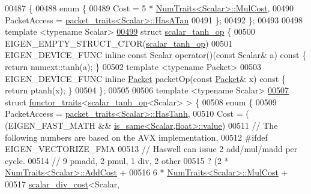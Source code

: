 \begin{DoxyCode}
00487 \{
00488   \textcolor{keyword}{enum} \{
00489     Cost = 5 * \hyperlink{group___core___module_struct_eigen_1_1_num_traits}{NumTraits<Scalar>::MulCost},
00490     PacketAccess = \hyperlink{struct_eigen_1_1internal_1_1packet__traits}{packet\_traits<Scalar>::HasATan}
00491   \};
00492 \};
00493 
00498 \textcolor{keyword}{template} <\textcolor{keyword}{typename} Scalar>
\hyperlink{struct_eigen_1_1internal_1_1scalar__tanh__op}{00499} \textcolor{keyword}{struct }\hyperlink{struct_eigen_1_1internal_1_1scalar__tanh__op}{scalar\_tanh\_op} \{
00500   EIGEN\_EMPTY\_STRUCT\_CTOR(\hyperlink{struct_eigen_1_1internal_1_1scalar__tanh__op}{scalar\_tanh\_op})
00501   EIGEN\_DEVICE\_FUNC \textcolor{keyword}{inline} \textcolor{keyword}{const} Scalar operator()(\textcolor{keyword}{const} Scalar& a)\textcolor{keyword}{ const }\{ \textcolor{keywordflow}{return} numext::tanh(a); \}
00502   \textcolor{keyword}{template} <\textcolor{keyword}{typename} Packet>
00503   EIGEN\_DEVICE\_FUNC \textcolor{keyword}{inline} \hyperlink{union_eigen_1_1internal_1_1_packet}{Packet} packetOp(\textcolor{keyword}{const} \hyperlink{union_eigen_1_1internal_1_1_packet}{Packet}& x)\textcolor{keyword}{ const }\{ \textcolor{keywordflow}{return} ptanh(x); \}
00504 \};
00505 
00506 \textcolor{keyword}{template} <\textcolor{keyword}{typename} Scalar>
\hyperlink{struct_eigen_1_1internal_1_1functor__traits_3_01scalar__tanh__op_3_01_scalar_01_4_01_4}{00507} \textcolor{keyword}{struct }\hyperlink{struct_eigen_1_1internal_1_1functor__traits}{functor\_traits}<\hyperlink{struct_eigen_1_1internal_1_1scalar__tanh__op}{scalar\_tanh\_op}<Scalar> > \{
00508   \textcolor{keyword}{enum} \{
00509     PacketAccess = \hyperlink{struct_eigen_1_1internal_1_1packet__traits}{packet\_traits<Scalar>::HasTanh},
00510     Cost = ( (EIGEN\_FAST\_MATH && \hyperlink{struct_eigen_1_1internal_1_1is__same}{is\_same<Scalar,float>::value})
00511 \textcolor{comment}{// The following numbers are based on the AVX implementation,}
00512 #ifdef EIGEN\_VECTORIZE\_FMA
00513                 \textcolor{comment}{// Haswell can issue 2 add/mul/madd per cycle.}
00514                 \textcolor{comment}{// 9 pmadd, 2 pmul, 1 div, 2 other}
00515                 ? (2 * \hyperlink{group___core___module_struct_eigen_1_1_num_traits}{NumTraits<Scalar>::AddCost} +
00516                    6 * \hyperlink{group___core___module_struct_eigen_1_1_num_traits}{NumTraits<Scalar>::MulCost} +
00517                    \hyperlink{struct_eigen_1_1internal_1_1scalar__div__cost}{scalar\_div\_cost}<Scalar,

\end{DoxyCode}

